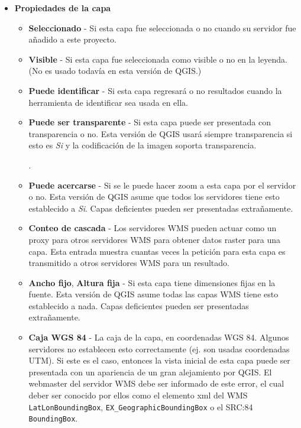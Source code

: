 {\begin{itemize}
\begin{itemize}
\end{itemize}

\item \textbf{Propiedades de la capa}

\begin{itemize}
\item \textbf{Seleccionado}         - Si esta capa fue seleccionada o no cuando su servidor fue añadido a este proyecto.

\item \textbf{Visible}          - Si esta capa fue seleccionada como visible o no en la leyenda.  (No es usado todavía en esta versión de QGIS.)

\item \textbf{Puede identificar}     - Si esta capa regresará o no resultados cuando la herramienta de identificar sea usada en ella.

\item \textbf{Puede ser transparente} - Si esta capa puede ser presentada con transparencia  o no. Esta versión de QGIS usará siempre transparencia si esto es \textsl{Si} y la codificación de la imagen soporta transparencia.

                                    .

\item \textbf{Puede acercarse}      - Si se le puede hacer zoom a esta capa por el servidor o no. Esta versión de QGIS asume que todos los servidores tiene esto establecido a \textsl{Si}. Capas deficientes pueden ser presentadas extrañamente.

\item \textbf{Conteo de cascada}    - Los servidores WMS pueden actuar como un proxy para otros servidores WMS para obtener datos raster para una capa. Esta entrada muestra cuantas veces la petición para esta capa es transmitido a otros servidores WMS para un resultado.

\item \textbf{Ancho fijo}, \textbf{Altura fija}
                                - Si esta capa tiene dimensiones fijas en la fuente. Esta versión de QGIS asume todas las capas WMS tiene esto establecido a nada. Capas deficientes pueden ser presentadas extrañamente.

\item \textbf{Caja WGS 84} - La caja de la capa, en coordenadas WGS 84. Algunos servidores no establecen esto correctamente (ej. son usadas coordenadas UTM). Si este es el caso, entonces la vista inicial de esta capa puede ser presentada con un apariencia de un gran alejamiento por QGIS. El webmaster del servidor WMS debe ser informado de este error, el cual deber ser conocido por ellos como el elemento xml del WMS                                     \texttt{LatLonBoundingBox},                                      \texttt{EX\_GeographicBoundingBox} o el SRC:84 \texttt{BoundingBox}.


\end{itemize}
\end{itemize}}
